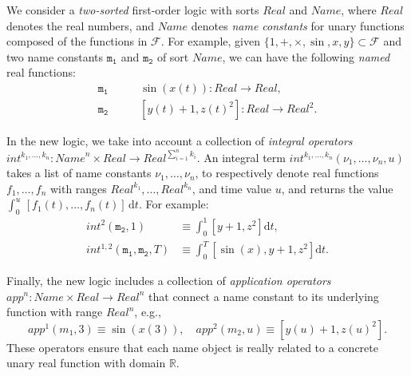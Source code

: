 We consider a \emph{two-sorted} first-order logic with sorts $\mathit{Real}$ and $\mathit{Name}$,
where $\mathit{Real}$ denotes the real numbers,
and $\mathit{Name}$ denotes \emph{name constants} 
for unary functions composed of the functions in $\mathcal{F}$.
For example, given $\{1, +, \times, \sin, x, y\} \subset \mathcal{F}$
and two name constants $\mathtt{m_1}$ and $\mathtt{m_2}$ of sort $\mathit{Name}$,
we can have the following \emph{named} real functions:
\begin{align*}
\mathtt{m_1}&\qquad
\sin(x(t)) :\mathit{Real} \to \mathit{Real},
\\
\mathtt{m_2}&\qquad
[y(t) + 1, z(t)^2] :  \mathit{Real} \to \mathit{Real}^2.
\end{align*}

In the new logic,  we take into account
a collection of \emph{integral operators} 
$\mathit{int}^{k_1,\ldots,k_n} :  \mathit{Name}^n \times \mathit{Real} \to \mathit{Real}^{\sum_{i=1}^n k_i}$.
An integral term
$\mathit{int}^{k_1,\ldots,k_n}(\nu_1,\ldots,\nu_n,u)$
takes a list of name constants $\nu_1,\ldots,\nu_n$,
to respectively denote real functions $f_1,\ldots,f_n$ with ranges $\mathit{Real}^{k_1},\ldots,\mathit{Real}^{k_n}$,
and time value $u$,
and returns the value $\int_0^u \, [f_1(t),\ldots,f_n(t)] \,\mathrm{d}t$.  
For example:
\begin{align*}
\mathit{int}^{2}(\mathtt{m_2}, 1) 
&\equiv
\int_0^1
[y + 1, z^2]
\mathrm{d}t,
\\
\mathit{int}^{1,2}(\mathtt{m_1},\mathtt{m_2}, T) 
&\equiv
\int_0^T
[\sin(x),y + 1,z^2]
\mathrm{d}t.
\end{align*}


Finally, the new logic 
includes
a collection of \emph{application operators} $\mathit{app}^n : \mathit{Name} \times \mathit{Real} \to \mathit{Real}^n$
that connect a name constant to its underlying function with range $\mathit{Real}^n$, e.g.,
\[
\mathit{app}^1(\mathit{m_1}, 3) \equiv \sin(x(3)),
\quad
\mathit{app}^2(\mathit{m_2}, u) \equiv [y(u) + 1,z(u)^2].
\]
These operators ensure that each name object is really related to a concrete unary real function with domain $\mathbb{R}$.
 







